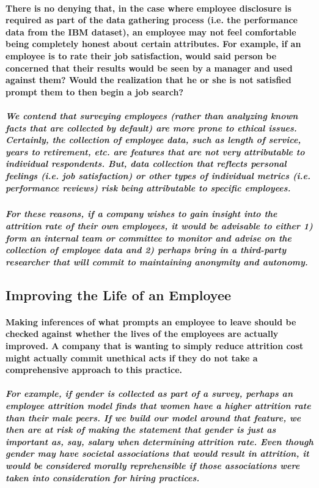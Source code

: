 \documentclass{article}
\begin{document}
\paragraph{There is no denying that, in the case where employee disclosure is required as part of the data gathering process (i.e. the performance data from the IBM dataset), an employee may not feel comfortable being completely honest about certain attributes. For example, if an employee is to rate their job satisfaction, would said person be concerned that their results would be seen by a manager and used against them? Would the realization that he or she is not satisfied prompt them to then begin a job search?}
 
\subparagraph{We contend that surveying employees (rather than analyzing known facts that are collected by default) are more prone to ethical issues. Certainly, the collection of employee data, such as length of service, years to retirement, etc. are features that are not very attributable to individual respondents. But, data collection that reflects personal feelings (i.e. job satisfaction) or other types of individual metrics (i.e. performance reviews) risk being attributable to specific employees.}
 
\subparagraph{For these reasons, if a company wishes to gain insight into the attrition rate of their own employees, it would be advisable to either 1) form an internal team or committee to monitor and advise on the collection of employee data and 2) perhaps bring in a third-party researcher that will commit to maintaining anonymity and autonomy.}
 
\subsection{Improving the Life of an Employee}

\paragraph{Making inferences of what prompts an employee to leave should be checked against whether the lives of the employees are actually improved. A company that is wanting to simply reduce attrition cost might actually commit unethical acts if they do not take a comprehensive approach to this practice.}

\subparagraph{For example, if gender is collected as part of a survey, perhaps an employee attrition model finds that women have a higher attrition rate than their male peers. If we build our model around that feature, we then are at risk of making the statement that gender is just as important as, say, salary when determining attrition rate. Even though gender may have societal associations that would result in attrition, it would be considered morally reprehensible if those associations were taken into consideration for hiring practices.}
 
\end{document}
